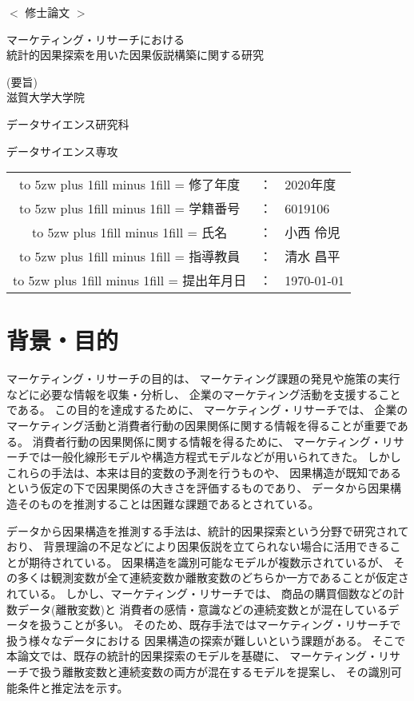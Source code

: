 \documentclass[uplatex]{jsarticle}
\theoremstyle{definition}
\newcommand{\kintou}[2]{%
\leavevmode
\hbox to #1{%
\kanjiskip=0pt plus 1fill minus 1fill
\xkanjiskip=\kanjiskip
#2}}
\begin{document}
\begin{center}
  \vspace*{15mm}
  \huge $<$ 修士論文 $>$ \par
  \vspace{15mm}
  \huge マーケティング・リサーチにおける \\
  統計的因果探索を用いた因果仮説構築に関する研究 \par
  \vspace{10.5mm}
  \LARGE (要旨) \\
  \vspace{10.5mm}
  \LARGE 滋賀大学大学院 \par
  \LARGE データサイエンス研究科 \par
  \LARGE データサイエンス専攻 \par
  \vspace{30mm}
  \LARGE
  \begin{tabular}{ccl}
    \kintou{5zw}{修了年度}&：& 2020年度 \\
    \kintou{5zw}{学籍番号}&：& 6019106 \\
    \kintou{5zw}{氏名}&：& 小西 伶児 \\
    \kintou{5zw}{指導教員}&：& 清水 昌平 \\
    \kintou{5zw}{提出年月日}&：& \today \\
  \end{tabular}
\end{center}

\thispagestyle{empty}
\newpage

\section{背景・目的}
マーケティング・リサーチの目的は、
マーケティング課題の発見や施策の実行などに必要な情報を収集・分析し、
企業のマーケティング活動を支援することである。
この目的を達成するために、
マーケティング・リサーチでは、
企業のマーケティング活動と消費者行動の因果関係に関する情報を得ることが重要である。
消費者行動の因果関係に関する情報を得るために、
マーケティング・リサーチでは一般化線形モデルや構造方程式モデルなどが用いられてきた。
しかしこれらの手法は、本来は目的変数の予測を行うものや、
因果構造が既知であるという仮定の下で因果関係の大きさを評価するものであり、
データから因果構造そのものを推測することは困難な課題であるとされている。

データから因果構造を推測する手法は、統計的因果探索という分野で研究されており、
背景理論の不足などにより因果仮説を立てられない場合に活用できることが期待されている。
因果構造を識別可能なモデルが複数示されているが、
その多くは観測変数が全て連続変数か離散変数のどちらか一方であることが仮定されている。
しかし、マーケティング・リサーチでは、
商品の購買個数などの計数データ(離散変数)と
消費者の感情・意識などの連続変数とが混在しているデータを扱うことが多い。
そのため、既存手法ではマーケティング・リサーチで扱う様々なデータにおける
因果構造の探索が難しいという課題がある。
そこで本論文では、既存の統計的因果探索のモデルを基礎に、
マーケティング・リサーチで扱う離散変数と連続変数の両方が混在するモデルを提案し、
その識別可能条件と推定法を示す。
\end{document}
